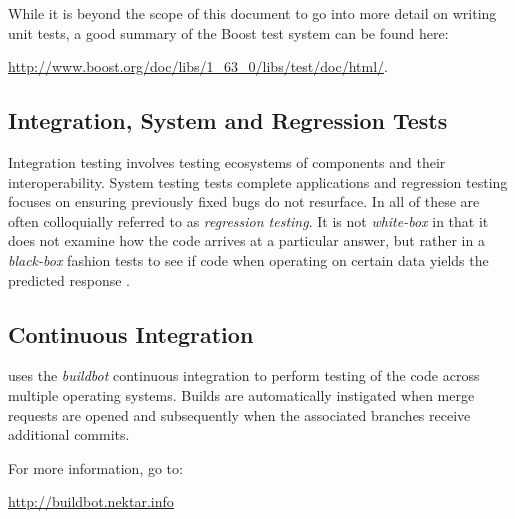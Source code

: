 While it is beyond the scope of this document to go into more detail
on writing unit tests, a good summary of the Boost test system can be
found here:

\url{http://www.boost.org/doc/libs/1\_63\_0/libs/test/doc/html/}.


\subsection{Integration, System and Regression Tests}
Integration testing involves testing ecosystems of components and their interoperability. System testing tests complete applications and regression testing focuses on ensuring previously fixed bugs do not resurface. In {\nek} all of these are often colloquially referred to as {\em regression testing}. It is not \emph{white-box} in that it does not examine how the
code arrives at a particular answer, but rather in a \emph{black-box}
fashion tests to see if code when operating on certain data yields the
predicted response \cite{KFN-testing}.

\subsection{Continuous Integration}
{\nek} uses the \emph{buildbot} continuous integration to perform testing of the code across multiple operating systems.  Builds are automatically instigated when merge requests are opened and subsequently when the associated branches receive additional commits.

For more information, go to:

\url{http://buildbot.nektar.info}


%


